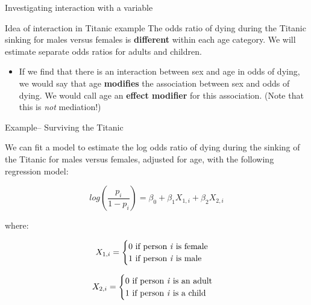 \documentclass[ignorenonframetext,]{beamer}
\providecommand{\tightlist}{%
  \setlength{\itemsep}{0pt}\setlength{\parskip}{0pt}}
\begin{document}
\begin{frame}{Investigating interaction with a variable}

\begin{block}{Idea of interaction in Titanic example}
The odds ratio of dying during the Titanic sinking for males versus females is \textbf{different} within each age category. We will estimate separate odds ratios for adults and children.
\end{block}

\begin{itemize}
\tightlist
\item
  If we find that there is an interaction between sex and age in odds of
  dying, we would say that age \textbf{modifies} the association between
  sex and odds of dying. We would call age an \textbf{effect modifier}
  for this association. (Note that this is \emph{not} mediation!)
\end{itemize}

\end{frame}

\begin{frame}{Example-- Surviving the Titanic}

We can fit a model to estimate the log odds ratio of dying during the
sinking of the Titanic for males versus females, adjusted for age, with
the following regression model:

\[
log(\frac{p_i}{1 - p_i}) = \beta_0 + \beta_1X_{1,i} + \beta_2X_{2,i}
\]

where:

\begin{equation*}
    X_{1,i}=
    \begin{cases}
      0 \text{ if person \textit{i} is female} \\
      1 \text{ if person \textit{i} is male}
    \end{cases}
\end{equation*}

\begin{equation*}
    X_{2,i}=
    \begin{cases}
      0 \text{ if person \textit{i} is an adult} \\
      1 \text{ if person \textit{i} is a child}
    \end{cases}
\end{equation*}

\end{frame}
\end{document}
